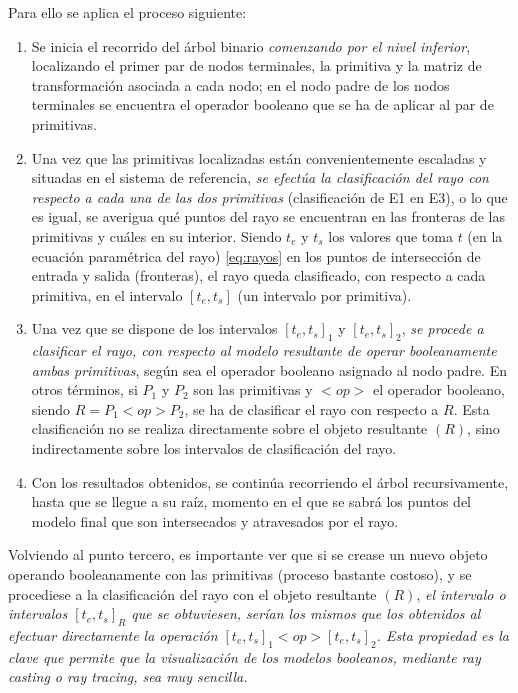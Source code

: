 Para ello se aplica el proceso siguiente: 
\begin{enumerate}
    \item Se inicia el recorrido del árbol binario \textit{comenzando por el nivel inferior}, localizando el primer par de nodos terminales, la primitiva y la matriz de transformación asociada a cada nodo; en el nodo padre de los nodos terminales se encuentra el operador booleano que se ha de aplicar al par de primitivas.
    \item Una vez que las primitivas localizadas están convenientemente escaladas y situadas en el sistema de referencia, \textit{se efectúa la clasificación del rayo con respecto a cada una de las dos primitivas} (clasificación de E1 en E3), o lo que es igual, se averigua qué puntos del rayo se encuentran en las fronteras de las primitivas y cuáles en su interior. Siendo $t_e$ y $t_s$ los valores que toma $t$ (en la ecuación paramétrica del rayo) \ref{eq:rayos} en los puntos de intersección de entrada y salida (fronteras), el rayo queda clasificado, con respecto a cada primitiva, en el intervalo $[t_e, t_s]$ (un intervalo por primitiva).
    \item Una vez que se dispone de los intervalos ${[t_e, t_s]}_1$ y ${[t_e, t_s]}_2$, \textit{se procede a clasificar el rayo, con respecto al modelo resultante de operar booleanamente ambas primitivas}, según sea el operador booleano asignado al nodo padre. En otros términos, si $P_1$ y $P_2$ son las primitivas y $<op>$ el operador booleano, siendo $R = P_1 <op> P_2$, se ha de clasificar el rayo con respecto a $R$. Esta clasificación no se realiza directamente sobre el objeto resultante $(R)$, sino indirectamente sobre los intervalos de clasificación del rayo.
    \item Con los resultados obtenidos, se continúa recorriendo el árbol recursivamente, hasta que se llegue a su raíz, momento en el que se sabrá los puntos del modelo final que son intersecados y atravesados por el rayo.
    
\end{enumerate}

Volviendo al punto tercero, es importante ver que si se crease un nuevo objeto operando booleanamente con las primitivas (proceso bastante costoso), y se procediese a la clasificación del rayo con el objeto resultante $(R)$, \textit{el intervalo o intervalos ${[t_e, t_s]}_R$ que se obtuviesen, serían los mismos que los obtenidos al efectuar directamente la operación ${[t_e, t_s]}_1 <op> {[t_e, t_s]}_2$. Esta propiedad es la clave que permite que la visualización de los modelos booleanos, mediante ray casting o ray tracing, sea muy sencilla.}


